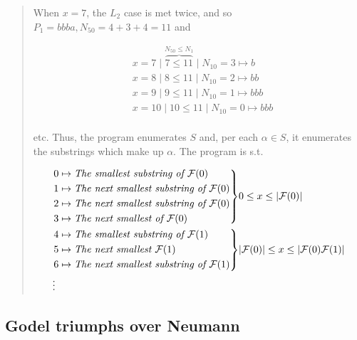 \documentclass[a4paper, 12pt]{article}
\newenvironment{rcases}
  {\left.\begin{aligned}}
  {\end{aligned}\right\rbrace}
\begin{document}
\begin{quote}
When $x = 7$, the $L_{2}$ case is met twice, and so $P_1 = bbba, N_{50} = 4 + 3
+ 4 = 11$ and

\begin{align*}
    &x = 7 \mid  \overbrace{7 \leq 11}^{N_{50} \leq N_1} \mid N_{10} = 3  \mapsto
    b\\
    &x = 8 \mid  {8 \leq 11} \mid N_{10} = 2  \mapsto
    bb\\
    &x = 9 \mid  {9 \leq 11} \mid N_{10} = 1  \mapsto
    bbb\\
    &x = 10 \mid  {10 \leq 11} \mid N_{10} = 0  \mapsto
    bbb\\
\end{align*}

etc. Thus, the program enumerates $S$ and, per each $\alpha \in S$, it
enumerates the substrings which make up $\alpha$. The program is s.t. 

\begin{align*}
    &\begin{rcases}
        &0 \mapsto \textit{The smallest substring of $\mathcal{F}(0)$} \\
        &1 \mapsto \textit{The next smallest substring of $\mathcal{F}(0)$} \\
        &2 \mapsto \textit{The next smallest substring of $\mathcal{F}(0)$} \\
        &3 \mapsto \textit{The next  smallest of $\mathcal{F}(0)$} \\
    \end{rcases}
    \text{$0\leq x \leq |\mathcal{F}(0)|$}\\
    &\begin{rcases}
        &4 \mapsto \textit{The smallest substring of $\mathcal{F}(1)$} \\
        &5 \mapsto \textit{The next smallest $\mathcal{F}(1)$} \\
        &6 \mapsto \textit{The next smallest substring of $\mathcal{F}(1)$} \\
    \end{rcases}
    \text{$|\mathcal{F}(0)| \leq x \leq |\mathcal{F}(0)\mathcal{F}(1)|$} \\ 
    &\vdots 
\end{align*}

\end{quote}
\normalsize

\subsection{Godel triumphs over Neumann}
\end{document}
